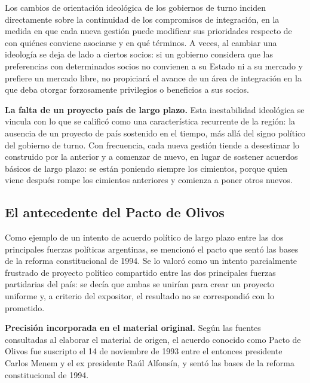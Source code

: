 \documentclass[12pt,oneside]{book}
\begin{document}
Los cambios de orientación ideológica de los gobiernos de turno inciden directamente sobre la continuidad de los compromisos de integración, en la medida en que cada nueva gestión puede modificar sus prioridades respecto de con quiénes conviene asociarse y en qué términos. A veces, al cambiar una ideología se deja de lado a ciertos socios: si un gobierno considera que las preferencias con determinados socios no convienen a su Estado ni a su mercado y prefiere un mercado libre, no propiciará el avance de un área de integración en la que deba otorgar forzosamente privilegios o beneficios a sus socios.

\begin{note}
\textbf{La falta de un proyecto país de largo plazo.} Esta inestabilidad ideológica se vincula con lo que se calificó como una característica recurrente de la región: la ausencia de un proyecto de país sostenido en el tiempo, más allá del signo político del gobierno de turno. Con frecuencia, cada nueva gestión tiende a desestimar lo construido por la anterior y a comenzar de nuevo, en lugar de sostener acuerdos básicos de largo plazo: se están poniendo siempre los cimientos, porque quien viene después rompe los cimientos anteriores y comienza a poner otros nuevos.
\end{note}

\subsection{El antecedente del Pacto de Olivos}

Como ejemplo de un intento de acuerdo político de largo plazo entre las dos principales fuerzas políticas argentinas, se mencionó el pacto que sentó las bases de la reforma constitucional de 1994. Se lo valoró como un intento parcialmente frustrado de proyecto político compartido entre las dos principales fuerzas partidarias del país: se decía que ambas se unirían para crear un proyecto uniforme y, a criterio del expositor, el resultado no se correspondió con lo prometido.

\begin{note}
\textbf{Precisión incorporada en el material original.} Según las fuentes consultadas al elaborar el material de origen, el acuerdo conocido como Pacto de Olivos fue suscripto el 14 de noviembre de 1993 entre el entonces presidente Carlos Menem y el ex presidente Raúl Alfonsín, y sentó las bases de la reforma constitucional de 1994.
\end{note}
\end{document}
